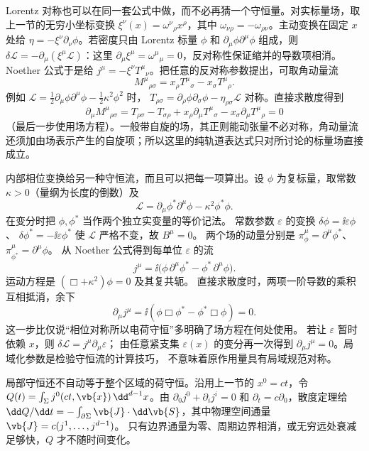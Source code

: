 Lorentz 对称也可以在同一套公式中做，而不必再猜一个守恒量。对实标量场，取上一节的无穷小坐标变换
\(\xi^\nu(x)=\omega^\nu{}_{\rho}x^\rho\)，其中
\(\omega_{\nu\rho}=-\omega_{\rho\nu}\)。主动变换在固定 \(x\) 处给
\(\eta=-\xi^\nu\partial_\nu\phi\)。若密度只由 Lorentz 标量
\(\phi\) 和 \(\partial_\mu\phi\partial^\mu\phi\) 组成，则
\(\delta\mathcal L=-\partial_\mu(\xi^\mu\mathcal L)\)：这里
\(\partial_\mu\xi^\mu=\omega^\mu{}_{\mu}=0\)，反对称性保证缩并的导数项相消。Noether 公式于是给
\(j^\mu=-\xi^\nu T^\mu{}_{\nu}\)。把任意的反对称参数提出，可取角动量流
\[
M^\mu{}_{\rho\sigma}
=x_\rho T^\mu{}_{\sigma}-x_\sigma T^\mu{}_{\rho}.
\]
例如 \(\mathcal L=\tfrac12\partial_\mu\phi\partial^\mu\phi-\tfrac12\kappa^2\phi^2\) 时，
\(T_{\rho\sigma}=\partial_\rho\phi\partial_\sigma\phi-\eta_{\rho\sigma}\mathcal L\) 对称。直接求散度得到
\[
\partial_\mu M^\mu{}_{\rho\sigma}
=T_{\rho\sigma}-T_{\sigma\rho}
+x_\rho\partial_\mu T^\mu{}_{\sigma}
-x_\sigma\partial_\mu T^\mu{}_{\rho}=0
\]
（最后一步使用场方程）。一般带自旋的场，其正则能动张量不必对称，角动量流还须加由场表示产生的自旋项；所以这里的纯轨道表达式只对所讨论的标量场直接成立。

内部相位变换给另一种守恒流，而且可以把每一项算出。设
\(\phi\) 为复标量，取常数 \(\kappa>0\)（量纲为长度的倒数）及
\[
\mathcal L=\partial_\mu\phi^*\partial^\mu\phi-\kappa^2\phi^*\phi .
\]
在变分时把 \(\phi,\phi^*\) 当作两个独立实变量的等价记法。
常数参数 \(\varepsilon\) 的变换
\(\delta\phi=\ii\varepsilon\phi\)、
\(\delta\phi^*=-\ii\varepsilon\phi^*\)
使 \(\mathcal L\) 严格不变，故 \(B^\mu=0\)。
两个场的动量分别是
\(\pi_\phi^\mu=\partial^\mu\phi^*\)、
\(\pi_{\phi^*}^\mu=\partial^\mu\phi\)。
从 Noether 公式得到每单位 \(\varepsilon\) 的流
\[
j^\mu=\ii\bigl(\phi\,\partial^\mu\phi^*
-\phi^*\,\partial^\mu\phi\bigr).
\]
运动方程是 \((\Box+\kappa^2)\phi=0\) 及其复共轭。
直接求散度时，两项一阶导数的乘积互相抵消，余下
\[
\partial_\mu j^\mu
=\ii(\phi\Box\phi^*-\phi^*\Box\phi)=0.
\]
这一步比仅说“相位对称所以电荷守恒”多明确了场方程在何处使用。
若让 \(\varepsilon\) 暂时依赖 \(x\)，则
\(\delta\mathcal L=j^\mu\partial_\mu\varepsilon\)；
由任意紧支集 \(\varepsilon(x)\) 的变分再一次得到
\(\partial_\mu j^\mu=0\)。局域化参数是检验守恒流的计算技巧，
不意味着原作用量具有局域规范对称。

局部守恒还不自动等于整个区域的荷守恒。沿用上一节的 \(x^0=ct\)，令
\(Q(t)=\int_\Sigma j^0(ct,\vb{x})\,\dd^{d-1}x\)。由
\(\partial_0j^0+\partial_i j^i=0\) 和 \(\partial_t=c\partial_0\)，散度定理给
\(\dd Q/\dd t=-\int_{\partial\Sigma}\vb{J}\cdot\dd\vb{S}\)，其中物理空间通量 \(\vb{J}=c(j^1,\ldots,j^{d-1})\)。
只有边界通量为零、周期边界相消，或无穷远处衰减足够快，\(Q\) 才不随时间变化。



